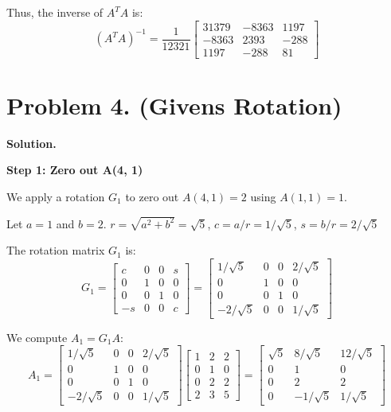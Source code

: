 \documentclass{article}
\newcommand{\0}{{\mathbf{0}}} %
\begin{document}
Thus, the inverse of $A^T A$ is:
$$ (A^T A)^{-1} = \frac{1}{12321}
\begin{bmatrix} 31379 & -8363 & 1197 \\ -8363 & 2393 & -288 \\ 1197 & -288 & 81
\end{bmatrix} $$

\section*{Problem 4. (Givens Rotation)}
\textbf{Solution.}

\textbf{Step 1: Zero out A(4, 1)}

We apply a rotation $G_1$ to zero out $A(4, 1) = 2$ using $A(1, 1) = 1$.

Let $a = 1$ and $b = 2$.
$r = \sqrt{a^2 + b^2} = \sqrt{5}$,
$c = a/r = 1/\sqrt{5}$,
$s = b/r = 2/\sqrt{5}$

The rotation matrix $G_1$ is:
$$ G_1 =
\begin{bmatrix} c & 0 & 0 & s \\ 0 & 1 & 0 & 0 \\ 0 & 0 & 1 & 0 \\ -s & 0 & 0 & c
\end{bmatrix} =
\begin{bmatrix} 1/\sqrt{5} & 0 & 0 & 2/\sqrt{5} \\ 0 & 1 & 0 & 0 \\ 0 & 0 & 1 & 0 \\ -2/\sqrt{5} & 0 & 0 & 1/\sqrt{5}
\end{bmatrix} $$

We compute $A_1 = G_1 A$:
$$ A_1 =
\begin{bmatrix} 1/\sqrt{5} & 0 & 0 & 2/\sqrt{5} \\ 0 & 1 & 0 & 0 \\ 0 & 0 & 1 & 0 \\ -2/\sqrt{5} & 0 & 0 & 1/\sqrt{5}
\end{bmatrix}
\begin{bmatrix} 1 & 2 & 2 \\ 0 & 1 & 0 \\ 0 & 2 & 2 \\ 2 & 3 & 5
\end{bmatrix} =
\begin{bmatrix} \sqrt{5} & 8/\sqrt{5} & 12/\sqrt{5} \\ 0 & 1 & 0 \\ 0 & 2 & 2 \\ 0 & -1/\sqrt{5} & 1/\sqrt{5}
\end{bmatrix} $$
\end{document}
